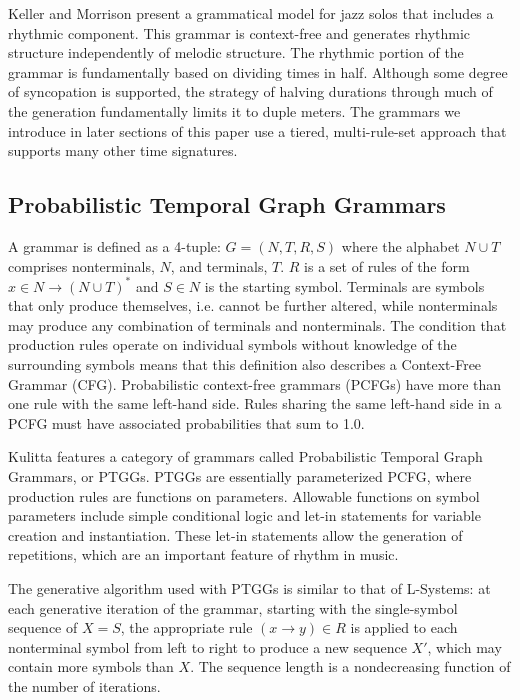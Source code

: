 \documentclass{article}
\begin{document}
Keller and Morrison present a grammatical model for jazz solos that includes a rhythmic component\cite{keller}. This grammar is context-free and generates rhythmic structure independently of melodic structure. The rhythmic portion of the grammar is fundamentally based on dividing times in half. Although some degree of syncopation is supported, the strategy of halving durations through much of the generation fundamentally limits it to duple meters. The grammars we introduce in later sections of this paper use a tiered, multi-rule-set approach that supports many other time signatures. 

\subsection{Probabilistic Temporal Graph Grammars}

A grammar is defined as a 4-tuple: $G = (N,T,R,S)$ where the alphabet $N \cup T$ comprises nonterminals, $N$, \linebreak and terminals, $T$. $R$ is a set of rules of the form \linebreak $x \in N \rightarrow (N \cup T)^{*}$ and $S \in N$ is the starting symbol. Terminals are symbols that only produce themselves, i.e. cannot be further altered, while nonterminals may produce any combination of terminals and nonterminals. The condition that production rules operate on individual symbols without knowledge of the surrounding symbols means that this definition also describes a Context-Free Grammar (CFG). Probabilistic context-free grammars (PCFGs) have more than one rule with the same left-hand side. Rules sharing the same left-hand side in a PCFG must have associated probabilities that sum to 1.0.

Kulitta features a category of grammars called Probabilistic Temporal Graph Grammars\cite{quick2013farm, quick_thesis}, or PTGGs. PTGGs are essentially parameterized PCFG, where production \linebreak rules are functions on parameters. Allowable functions on symbol parameters include simple conditional logic and let-in statements for variable creation and instantiation. \linebreak These let-in statements allow the generation of repetitions, which are an important feature of rhythm in music.

The generative algorithm used with PTGGs is similar to that of L-Systems: at each generative iteration of the grammar, starting with the single-symbol sequence of $X = S$, the appropriate rule $(x \rightarrow y) \in R$ is applied to each nonterminal symbol from left to right to produce a new sequence $X'$, which may contain more symbols than $X$. The sequence length is a nondecreasing function of the number of iterations. 
\end{document}
